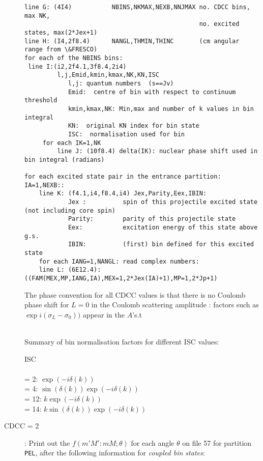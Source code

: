 \documentclass[11pt]{article}
\begin{document}
\begin{description}
{\begin{verbatim}
line G: (4I4)           NBINS,NKMAX,NEXB,NNJMAX no. CDCC bins, max NK,
                                                no. excited states, max(2*Jex+1)
line H: (I4,2f8.4)      NANGL,THMIN,THINC       (cm angular range from \&FRESCO)
for each of the NBINS bins:
 line I:(i2,2f4.1,3f8.4,2i4)
         l,j,Emid,kmin,kmax,NK,KN,ISC
            l,j: quantum numbers  (s==Jv)
            Emid:  centre of bin with respect to continuum threshold
            kmin,kmax,NK: Min,max and number of k values in bin integral
            KN:  original KN index for bin state
            ISC:  normalisation used for bin
     for each IK=1,NK
         line J: (10f8.4) delta(IK): nuclear phase shift used in bin integral (radians)

for each excited state pair in the entrance partition: IA=1,NEXB::
    line K: (f4.1,i4,f8.4,i4) Jex,Parity,Eex,IBIN:
            Jex :          spin of this projectile excited state  (not including core spin)
            Parity:        parity of this projectile state
            Eex:           excitation energy of this state above g.s.
            IBIN:          (first) bin defined for this excited state
    for each IANG=1,NANGL: read complex numbers:
    line L: (6E12.4): ((FAM(MEX,MP,IANG,IA),MEX=1,2*Jex(IA)+1),MP=1,2*Jp+1)
\end{verbatim}
}

The phase convention for all CDCC values is that there is no Coulomb phase shift
for $L = 0$ in the Coulomb scattering amplitude : factors such as
$\exp i(\sigma_L-\sigma_0))$  appear in the $A$'s.t

~\\
Summary of bin normalisation factors for different ISC values:

ISC\\
\\ = 2:  $\exp(-i\delta(k))$
\\ = 4:  $\sin(\delta(k))\exp(-i\delta(k))$
\\ = 12:  $k\exp(-i\delta(k))$
\\ = 14:  $k\sin(\delta(k))\exp(-i\delta(k))$

\item[CDCC = 2]:
Print out the $f(m'M':mM; \theta)$ for each angle $\theta$
on file 57 for partition {\tt PEL}, after the following information for {\em coupled bin states}:



\end{description}
\end{document}
